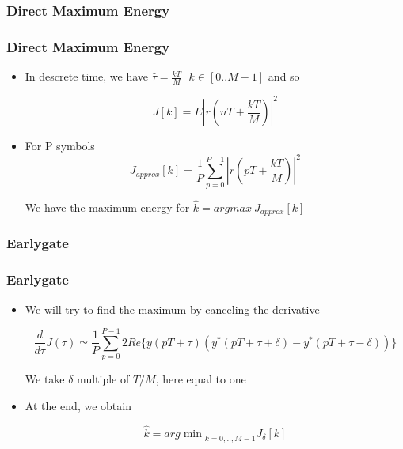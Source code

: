 \documentclass[11pt]{beamer}
\begin{document}
\subsubsection{Direct Maximum Energy}
\begin{frame}
\frametitle{Direct Maximum Energy}

\begin{itemize}

\item In descrete time, we have $\hat{\tau} = \frac{kT}{M} \ \ \ k \in  [0..M-1]$ and so
		
\begin{equation} 
J[k] = E|r(nT+\frac{kT}{M})|^2
\end{equation}

\item For P symbols
\begin{equation}
J_{approx}[k] = \frac{1}{P} \sum \limits_{p=0}^{P-1} |r(pT+\frac{kT}{M})|^2
\label{equ1}
\end{equation}

We have the maximum energy for $\hat{k}=argmax\ J_{approx}[k]$


\end{itemize}

\end{frame}

\subsubsection{Earlygate}

\begin{frame}
\frametitle{Earlygate}

\begin{itemize}

\item We will try to find the maximum by canceling the derivative

\begin{equation}
\frac{d}{d\tau} J(\tau)  \simeq \frac{1}{P} \sum_{p=0}^{P-1} 2Re\lbrace y(pT+\tau)(y^*(pT+\tau+\delta)-y^*(pT+\tau-\delta))\rbrace
\end{equation}

We take $\delta$ multiple of $T/M$, here equal to one

\item At the end, we obtain  

\begin{equation}
\hat{k}= {arg\min}_{k=0,..,M-1} J_{\delta}[k]
\end{equation}

\end{itemize}

\end{frame}
\end{document}

